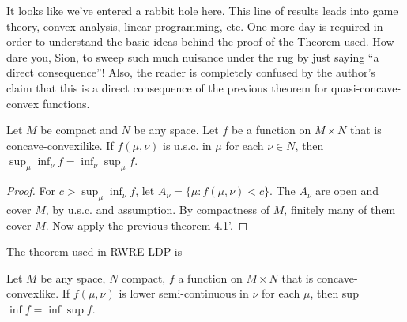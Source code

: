\followup It looks like we've entered a rabbit hole here. This line of results leads into game theory, convex analysis, linear programming, etc. One more day is required in order to understand the basic ideas behind the proof of the Theorem used. How dare you, Sion, to sweep such much nuisance under the rug by just saying ``a direct consequence''! Also, the reader is completely confused by the author's claim that this is a direct consequence of the previous theorem for quasi-concave-convex functions.

\begin{thm}
    Let $M$ be compact and $N$ be any space. Let $f$ be a function on $M \times N$ that is concave-convexilike. If $f(\mu, \nu)$ is u.s.c. in $\mu$ for each $\nu \in N$, then $\sup_\mu \inf_\nu f = \inf_\nu \sup_\mu f$.
\end{thm}
\begin{proof}
    For $c > \sup_\mu \inf_\nu f$, let $A_\nu = \{ \mu : f(\mu, \nu) < c \}$. The $A_\nu$ are open and cover $M$, by u.s.c. and assumption. By compactness of $M$, finitely many of them cover $M$. Now apply the previous theorem 4.1'.
\end{proof}

The theorem used in RWRE-LDP is

\begin{thm}
    Let $M$ be any space, $N$ compact, $f$ a function on $M \times N$ that is concave-convexlike. If $f(\mu, \nu)$ is lower semi-continuous in $\nu$ for each $\mu$, then sup $\inf f=\inf \sup f$.
\end{thm}



